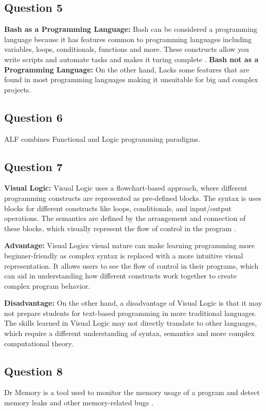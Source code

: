 \documentclass{article}
\begin{document}
\subsection*{Question 5}
\textbf{Bash as a Programming Language:} Bash can be considered a programming language because it has features common to programming languages including variables, loops, conditionals, functions and more. 
These constructs allow you write scripts and automate tasks and makes it turing complete \cite{linuxsimply2022bash}.
\textbf{Bash not as a Programming Language:} On the other hand, Lacks some features that are found in most programming languages making it unsuitable for big and complex projects.

\subsection*{Question 6}

ALF combines Functional and Logic programming paradigms.

\subsection*{Question 7}

\textbf{Visual Logic:} Visual Logic uses a flowchart-based approach, where different programming constructs are represented as pre-defined blocks. 
The syntax is uses blocks for different constructs like loops, conditionals, and input/output operations. 
The semantics are defined by the arrangement and connection of these blocks, which visually represent the flow of control in the program \cite{utc2021visuallogic}.

\textbf{Advantage:} Visual Logics visual nature can make learning programming more beginner-friendly as complex syntax is replaced with a more intuitive visual representation.
It allows users to see the flow of control in their programs, which can aid in understanding how different constructs work together to create complex program behavior.

\textbf{Disadvantage:} On the other hand, a disadvantage of Visual Logic is that it may not prepare students for text-based programming in more traditional languages. 
The skills learned in Visual Logic may not directly translate to other languages, which require a different understanding of syntax, semantics and more complex computational theory.

\subsection*{Question 8}
Dr Memory is a tool used to monitor the memory usage of a program and detect memory leaks and other memory-related bugs \cite{drmemory2022}.


\end{document}
